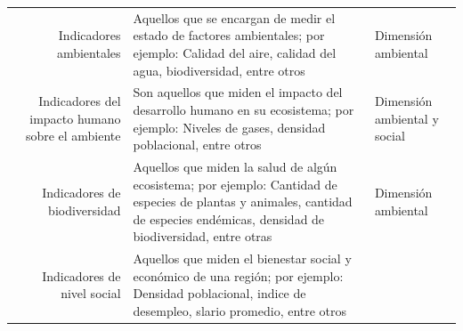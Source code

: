 \documentclass[12pt]{article}
\begin{document}
\begin{longtable}[]{@{}rll@{}}
	\endhead
	\begin{minipage}[t]{0.37\columnwidth}\raggedleft
	Indicadores ambientales\strut
	\end{minipage} & \begin{minipage}[t]{0.27\columnwidth}\raggedright
	Aquellos que se encargan de medir el estado de factores ambientales; por
	ejemplo: Calidad del aire, calidad del agua, biodiversidad, entre
	otros\strut
	\end{minipage} & \begin{minipage}[t]{0.27\columnwidth}\raggedright
	Dimensión ambiental\strut
	\end{minipage}\tabularnewline
	\begin{minipage}[t]{0.37\columnwidth}\raggedleft
	Indicadores del impacto humano sobre el ambiente\strut
	\end{minipage} & \begin{minipage}[t]{0.27\columnwidth}\raggedright
	Son aquellos que miden el impacto del desarrollo humano en su
	ecosistema; por ejemplo: Niveles de gases, densidad poblacional, entre
	otros\strut
	\end{minipage} & \begin{minipage}[t]{0.27\columnwidth}\raggedright
	Dimensión ambiental y social\strut
	\end{minipage}\tabularnewline
	\begin{minipage}[t]{0.37\columnwidth}\raggedleft
	Indicadores de biodiversidad\strut
	\end{minipage} & \begin{minipage}[t]{0.27\columnwidth}\raggedright
	Aquellos que miden la salud de algún ecosistema; por ejemplo: Cantidad
	de especies de plantas y animales, cantidad de especies endémicas,
	densidad de biodiversidad, entre otras\strut
	\end{minipage} & \begin{minipage}[t]{0.27\columnwidth}\raggedright
	Dimensión ambiental\strut
	\end{minipage}\tabularnewline
	\begin{minipage}[t]{0.37\columnwidth}\raggedleft
	Indicadores de nivel social\strut
	\end{minipage} & \begin{minipage}[t]{0.27\columnwidth}\raggedright
	Aquellos que miden el bienestar social y económico de una región; por
	ejemplo: Densidad poblacional, indice de desempleo, slario promedio,
	entre otros\strut
	\end{minipage} & \begin{minipage}[t]{0.27\columnwidth}\raggedright

\end{minipage}
\end{longtable}
\end{document}
